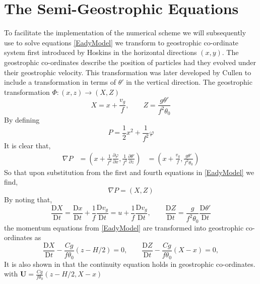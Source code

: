 \section{The Semi-Geostrophic Equations \label{transformation}}
To facilitate the implementation of the numerical scheme we will subsequently use to solve equations \ref{EadyModel} we transform to geostrophic co-ordinate system first introduced by Hoskins \cite{Hoskins1975} in the horizontal directions $(x,y)$. The geostrophic co-ordinates describe the position of particles had they evolved under their geostrophic velocity. This transformation was later developed by Cullen \cite{Cullen2006a} to include a transformation in terms of $\theta '$ in the vertical direction. The geostrophic transformation $\Phi: (x,z) \rightarrow (X,Z)$
\begin{equation}
X = x + \frac{v_g}{f}, \qquad Z = \frac{g\theta'}{f^2\theta_0}
\end{equation}
By defining
\begin{equation}
P = \frac{1}{2}x^2 + \frac{1}{f^2}\varphi
\label{P}
\end{equation}
It is clear that,
\begin{equation*}
\begin{aligned}
\nabla P &= \left(x + \frac{1}{f^2}\frac{\partial \varphi}{\partial x}, \frac{1}{f^2} \frac{\partial \theta'}{\partial z}\right)
&= \left(x + \frac{v_g}{f}, \frac{g\theta'}{f^2\theta_0}\right)
\end{aligned}
\end{equation*}
So that upon substitution from the first and fourth equations in \ref{EadyModel} we find,
\begin{equation}
\nabla P = (X,Z)
\label{gradP}
\end{equation}
By noting that,
\begin{equation*}
\frac{\mathrm{D}X}{\mathrm{D}t} = \frac{\mathrm{D}x}{\mathrm{D}t} + \frac{1}{f}\frac{\mathrm{D}v_g}{\mathrm{D}t} = u + \frac{1}{f}\frac{\mathrm{D}v_g}{\mathrm{D}t}, \qquad \frac{\mathrm{D}Z}{\mathrm{D}t} = \frac{g}{f^2\theta_0} \frac{\mathrm{D}\theta '}{\mathrm{D}t}
\end{equation*}
the momentum equations from \ref{EadyModel} are transformed into geostrophic co-ordinates as
\begin{equation}
\frac{\mathrm{D}X}{\mathrm{D}t} -\frac{Cg}{f\theta _0}\left(z-H/2\right) = 0,\qquad
\frac{\mathrm{D}Z}{\mathrm{D}t} - \frac{Cg}{f\theta_0}\left(X - x\right) = 0,
\label{Gmom}
\end{equation}
It is also shown in \cite{Cullen2006a} that the continuity equation holds in geostrophic co-ordinates. with $\bm{U} = \frac{Cg}{f\theta _0}\left(z-H/2, X-x\right) $
